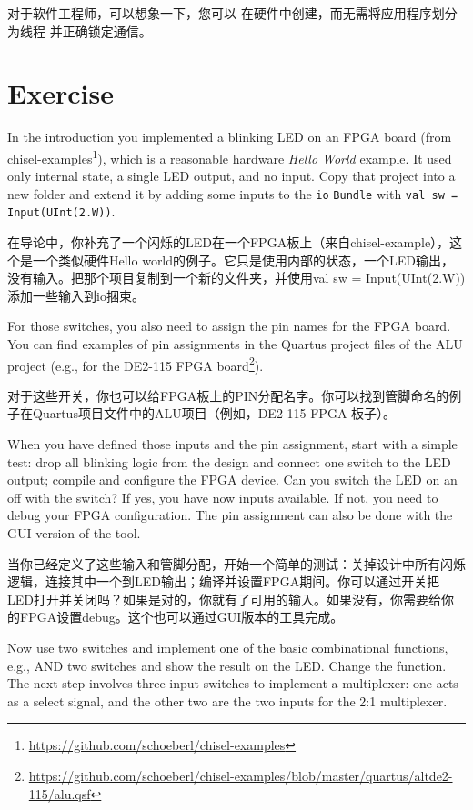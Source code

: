 \documentclass[%
    10pt,
    headinclude, footexclude,
    openright, %
    notitlepage,
    cleardoubleempty,
    headsepline,
    pointlessnumbers,
    bibtotoc, idxtotoc,
    ]{scrbook}
\newcommand{\code}[1]{{\small{\texttt{#1}}}}
\newcommand{\myref}[2]{\href{#1}{#2}}
\renewcommand{\myref}[2]{{#2}{\footnote{\url{#1}}}}
\begin{document}
对于软件工程师，可以想象一下，您可以
在硬件中创建，而无需将应用程序划分为线程
并正确锁定通信。

\section{Exercise}

In the introduction you implemented a blinking LED on an FPGA board
(from \myref{https://github.com/schoeberl/chisel-examples}{chisel-examples}), which is a reasonable
hardware \emph{Hello World} example. It used only internal state, a single LED output, and no input.
Copy that project into a new folder and extend it by adding some inputs to the \code{io} \code{Bundle}
with \code{val sw = Input(UInt(2.W))}.

在导论中，你补充了一个闪烁的LED在一个FPGA板上（来自chisel-example），这个是一个类似硬件Hello world的例子。它只是使用内部的状态，一个LED输出，没有输入。把那个项目复制到一个新的文件夹，并使用val sw = Input(UInt(2.W))添加一些输入到io捆束。



\noindent For those switches, you also need to assign the pin names for the FPGA board.
You can find examples of pin assignments in the Quartus project files of the ALU project
(e.g., for the \myref{https://github.com/schoeberl/chisel-examples/blob/master/quartus/altde2-115/alu.qsf}{DE2-115
FPGA board}).

对于这些开关，你也可以给FPGA板上的PIN分配名字。你可以找到管脚命名的例子在Quartus项目文件中的ALU项目（例如，DE2-115 FPGA 板子）。

When you have defined those inputs and the pin assignment, start with a simple test:
drop all blinking logic from the design and connect one switch to the LED output;
compile and configure the FPGA device. Can you switch the LED on an off with the switch?
If yes, you have now inputs available. If not, you need to debug your FPGA configuration.
The pin assignment can also be done with the GUI version of the tool.

当你已经定义了这些输入和管脚分配，开始一个简单的测试：关掉设计中所有闪烁逻辑，连接其中一个到LED输出；编译并设置FPGA期间。你可以通过开关把LED打开并关闭吗？如果是对的，你就有了可用的输入。如果没有，你需要给你的FPGA设置debug。这个也可以通过GUI版本的工具完成。


Now use two switches and implement one of the basic combinational functions,
e.g., AND two switches and show the result on the LED. Change the function.
The next step involves three input switches to implement a multiplexer: one acts as
a select signal, and the other two are the two inputs for the 2:1 multiplexer.
\end{document}
